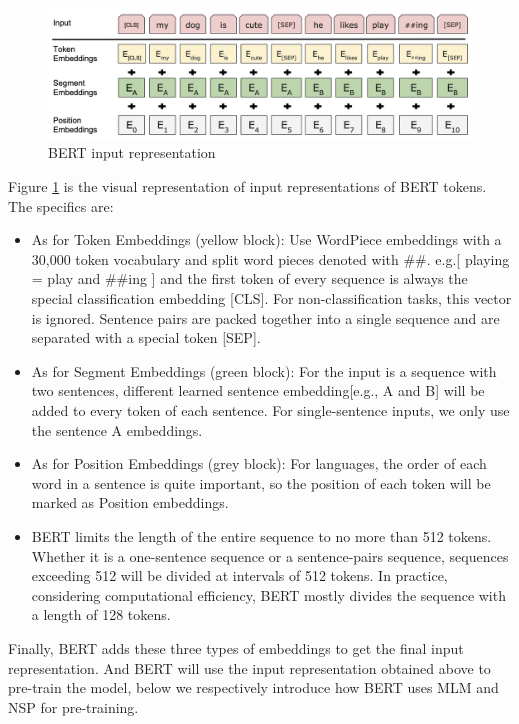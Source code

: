 \documentclass[]{krantz}
\begin{document}
\begin{figure}

{\centering \includegraphics[width=0.8\linewidth]{figures/02-03-transfer-learning-for-nlp/bert_input_representation} 

}

\caption{BERT input representation}\label{fig:ch02-03-figure02}
\end{figure}

Figure \ref{fig:ch02-03-figure02} is the visual representation of input representations of BERT tokens. The specifics are:

\begin{itemize}
\item
  As for Token Embeddings (yellow block): Use WordPiece embeddings \citet{wu2016google} with a 30,000 token vocabulary and split word pieces denoted with \#\#. e.g.{[} playing = play and \#\#ing {]} and the first token of every sequence is always the special classification embedding {[}CLS{]}. For non-classification tasks, this vector is ignored. Sentence pairs are packed together into a single sequence and are separated with a special token {[}SEP{]}.
\item
  As for Segment Embeddings (green block): For the input is a sequence with two sentences, different learned sentence embedding{[}e.g., A and B{]} will be added to every token of each sentence. For single-sentence inputs, we only use the sentence A embeddings.
\item
  As for Position Embeddings (grey block): For languages, the order of each word in a sentence is quite important, so the position of each token will be marked as Position embeddings.
\item
  BERT limits the length of the entire sequence to no more than 512 tokens. Whether it is a one-sentence sequence or a sentence-pairs sequence, sequences exceeding 512 will be divided at intervals of 512 tokens. In practice, considering computational efficiency, BERT mostly divides the sequence with a length of 128 tokens.
\end{itemize}

Finally, BERT adds these three types of embeddings to get the final input representation. And BERT will use the input representation obtained above to pre-train the model, below we respectively introduce how BERT uses MLM and NSP for pre-training.
\end{document}
